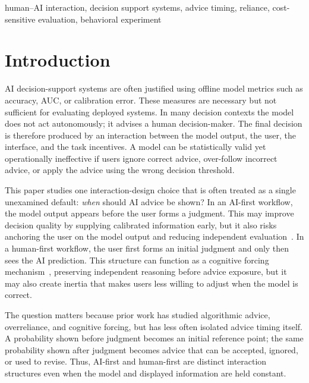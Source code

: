 \documentclass[conference]{IEEEtran}
\begin{document}
\begin{IEEEkeywords}
human--AI interaction, decision support systems, advice timing,
reliance, cost-sensitive evaluation, behavioral experiment
\end{IEEEkeywords}

\section{Introduction}
\label{sec:intro}

AI decision-support systems are often justified using offline model
metrics such as accuracy, AUC, or calibration error. These measures are
necessary but not sufficient for evaluating deployed systems. In many
decision contexts the model does not act autonomously; it advises a
human decision-maker. The final decision is therefore produced by an
interaction between the model output, the user, the interface, and the
task incentives. A model can be statistically valid yet operationally
ineffective if users ignore correct advice, over-follow incorrect advice,
or apply the advice using the wrong decision threshold.

This paper studies one interaction-design choice that is often treated
as a single unexamined default: \emph{when} should AI advice be shown?
In an AI-first workflow, the model output appears before the user forms
a judgment. This may improve decision quality by supplying calibrated
information early, but it also risks anchoring the user on the model
output and reducing independent evaluation~\cite{rastogi2022deciding}.
In a human-first workflow, the user first forms an initial judgment and
only then sees the AI prediction. This structure can function as a
cognitive forcing mechanism~\cite{bucinca2021trust}, preserving
independent reasoning before advice exposure, but it may also create
inertia that makes users less willing to adjust when the model is
correct.

The question matters because prior work has studied algorithmic advice,
overreliance, and cognitive forcing, but has less often isolated advice
timing itself. A probability shown before judgment becomes an initial
reference point; the same probability shown after judgment becomes advice
that can be accepted, ignored, or used to revise. Thus, AI-first and
human-first are distinct interaction structures even when the model and
displayed information are held constant.
\end{document}
